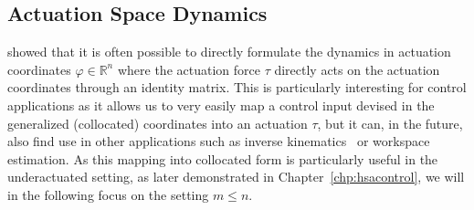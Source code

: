 \subsection{Actuation Space Dynamics}
\citet{pustina2024input} showed that it is often possible to directly formulate the dynamics in actuation coordinates $\varphi \in \mathbb{R}^n$ where the actuation force $\tau$ directly acts on the actuation coordinates through an identity matrix. This is particularly interesting for control applications as it allows us to very easily map a control input devised in the generalized (collocated) coordinates into an actuation $\tau$, but it can, in the future, also find use in other applications such as inverse kinematics~\citep{della2025pushing} or workspace estimation. As this mapping into collocated form is particularly useful in the underactuated setting, as later demonstrated in Chapter~\ref{chp:hsacontrol}, we will in the following focus on the setting $m \leq n$.

